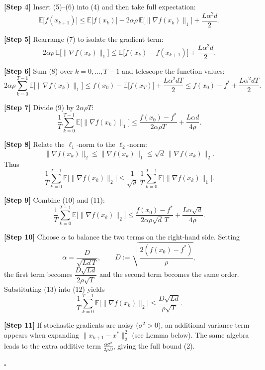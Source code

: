 \documentclass{article}
\newcommand{\E}{\mathbb{E}}
\begin{document}
\noindent\textbf{[Step 4]} Insert (5)–(6) into (4) and then take full expectation:
\[
\E\bigl[f(x_{k+1})\bigr]
\le \E\bigl[f(x_k)\bigr]
   -2\alpha\rho\,\E\!\bigl[\|\nabla f(x_k)\|_{1}\bigr]
   +\frac{L\alpha^{2}d}{2}.
\tag{7}
\]

\noindent\textbf{[Step 5]} Rearrange (7) to isolate the gradient term:
\[
2\alpha\rho\,\E\!\bigl[\|\nabla f(x_k)\|_{1}\bigr]
\le \E\bigl[f(x_k)-f(x_{k+1})\bigr]
   +\frac{L\alpha^{2}d}{2}.
\tag{8}
\]

\noindent\textbf{[Step 6]} Sum (8) over $k=0,\dots,T-1$ and telescope the function values:
\[
2\alpha\rho\sum_{k=0}^{T-1}\E\!\bigl[\|\nabla f(x_k)\|_{1}\bigr]
\le f(x_0)-\E\bigl[f(x_T)\bigr]
   +\frac{L\alpha^{2}dT}{2}
\le f(x_0)-f^{*}+\frac{L\alpha^{2}dT}{2}.
\tag{9}
\]

\noindent\textbf{[Step 7]} Divide (9) by $2\alpha\rho T$:
\[
\frac{1}{T}\sum_{k=0}^{T-1}\E\!\bigl[\|\nabla f(x_k)\|_{1}\bigr]
\le \frac{f(x_0)-f^{*}}{2\alpha\rho T}
   +\frac{L\alpha d}{4\rho } .
\tag{10}
\]

\noindent\textbf{[Step 8]} Relate the $\ell_{1}$‑norm to the $\ell_{2}$‑norm:
\[
\|\nabla f(x_k)\|_{2}\le\|\nabla f(x_k)\|_{1}
\le\sqrt{d}\,\|\nabla f(x_k)\|_{2}.
\]
Thus
\[
\frac{1}{T}\sum_{k=0}^{T-1}\E\!\bigl[\|\nabla f(x_k)\|_{2}\bigr]
\le \frac{1}{\sqrt{d}}\,
      \frac{1}{T}\sum_{k=0}^{T-1}\E\!\bigl[\|\nabla f(x_k)\|_{1}\bigr].
\tag{11}
\]

\noindent\textbf{[Step 9]} Combine (10) and (11):
\[
\frac{1}{T}\sum_{k=0}^{T-1}\E\!\bigl[\|\nabla f(x_k)\|_{2}\bigr]
\le
\frac{f(x_0)-f^{*}}{2\alpha\rho\sqrt{d}\,T}
   +\frac{L\alpha\sqrt{d}}{4\rho } .
\tag{12}
\]

\noindent\textbf{[Step 10]} Choose $\alpha$ to balance the two terms on the right‑hand side.  
Setting
\[
\alpha = \frac{D}{\sqrt{L d\,T}},\qquad
D:=\sqrt{\frac{2(f(x_0)-f^{*})}{\rho}} ,
\tag{13}
\]
the first term becomes $\dfrac{D\sqrt{L d}}{2\rho\sqrt{T}}$ and the second term becomes the same order.  Substituting (13) into (12) yields
\[
\frac{1}{T}\sum_{k=0}^{T-1}\E\!\bigl[\|\nabla f(x_k)\|_{2}\bigr]
\le
\frac{D\sqrt{L d}}{\rho\sqrt{T}} .
\tag{14}
\]

\noindent\textbf{[Step 11]} If stochastic gradients are noisy ($\sigma^{2}>0$), an additional variance term appears when expanding $\|x_{k+1}-x^{*}\|_{2}^{2}$ (see Lemma below).  The same algebra leads to the extra additive term $\frac{\alpha\sigma^{2}}{2\rho D}$, giving the full bound (2).

\hfill $\square$
\end{document}

